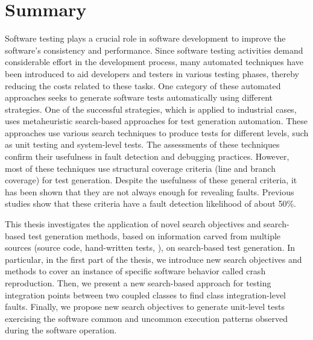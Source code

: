 \chapter*{Summary}

Software testing plays a crucial role in software development to improve the software's consistency and performance.
Since software testing activities demand considerable effort in the development process, many automated techniques have been introduced to aid developers and testers in various testing phases, thereby reducing the costs related to these tasks. One category of these automated approaches seeks to generate software tests automatically using different strategies. One of the successful strategies, which is applied to industrial cases, uses metaheuristic search-based approaches for test generation automation. These approaches use various search techniques to produce tests for different levels, such as unit testing and system-level tests. The assessments of these techniques confirm their usefulness in fault detection and debugging practices. However, most of these techniques use structural coverage criteria (\eg line and branch coverage) for test generation. Despite the usefulness of these general criteria, it has been shown that they are not always enough for revealing faults. Previous studies show that these criteria have a fault detection likelihood of about 50\%.

This thesis investigates the application of novel search objectives and search-based test generation methods, based on information carved from multiple sources (\eg source code, hand-written tests, \etc), on search-based test generation. In particular, in the first part of the thesis, we introduce new search objectives and methods to cover an instance of specific software behavior called crash reproduction. Then, we present a new search-based approach for testing integration points between two coupled classes to find class integration-level faults. Finally, we propose new search objectives to generate unit-level tests exercising the software common and uncommon execution patterns observed during the software operation.

